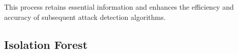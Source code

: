 \documentclass[conference]{IEEEtran}
\begin{document}



This process retains essential information and enhances the efficiency and accuracy of subsequent attack detection algorithms.

\subsection{Isolation Forest}
\label{sec:method_forest}




\end{document}
